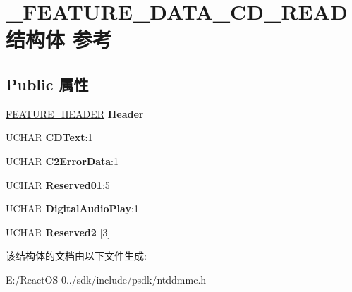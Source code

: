 \hypertarget{struct___f_e_a_t_u_r_e___d_a_t_a___c_d___r_e_a_d}{}\section{\+\_\+\+F\+E\+A\+T\+U\+R\+E\+\_\+\+D\+A\+T\+A\+\_\+\+C\+D\+\_\+\+R\+E\+A\+D结构体 参考}
\label{struct___f_e_a_t_u_r_e___d_a_t_a___c_d___r_e_a_d}
\subsection*{Public 属性}
\begin{DoxyCompactItemize}
\item 
\mbox{\label{struct___f_e_a_t_u_r_e___d_a_t_a___c_d___r_e_a_d_a0a134935fee851815b9fb86a8b889573}} 
\hyperlink{struct___f_e_a_t_u_r_e___h_e_a_d_e_r}{F\+E\+A\+T\+U\+R\+E\+\_\+\+H\+E\+A\+D\+ER} {\bfseries Header}
\item 
\mbox{\label{struct___f_e_a_t_u_r_e___d_a_t_a___c_d___r_e_a_d_ad219419d5b53d1ec9d6c12268efabe99}} 
U\+C\+H\+AR {\bfseries C\+D\+Text}\+:1
\item 
\mbox{\label{struct___f_e_a_t_u_r_e___d_a_t_a___c_d___r_e_a_d_a7311821a92954d8cb80a2158f6c99721}} 
U\+C\+H\+AR {\bfseries C2\+Error\+Data}\+:1
\item 
\mbox{\label{struct___f_e_a_t_u_r_e___d_a_t_a___c_d___r_e_a_d_a535331ca99de40aa395ae42db8c36d05}} 
U\+C\+H\+AR {\bfseries Reserved01}\+:5
\item 
\mbox{\label{struct___f_e_a_t_u_r_e___d_a_t_a___c_d___r_e_a_d_a7a7d7fa12c6aef8cbe250f5182eb5254}} 
U\+C\+H\+AR {\bfseries Digital\+Audio\+Play}\+:1
\item 
\mbox{\label{struct___f_e_a_t_u_r_e___d_a_t_a___c_d___r_e_a_d_a2fe0aa0ddcd7ec43e46e25c5edddf0cc}} 
U\+C\+H\+AR {\bfseries Reserved2} \mbox{[}3\mbox{]}
\end{DoxyCompactItemize}


该结构体的文档由以下文件生成\+:\begin{DoxyCompactItemize}
\item 
E\+:/\+React\+O\+S-\/0../sdk/include/psdk/ntddmmc.\+h\end{DoxyCompactItemize}
